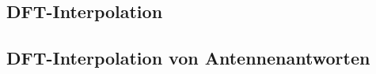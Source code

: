 %
%
\subsection{DFT-Interpolation}\label{dftintp}
%

%
%
\subsection{DFT-Interpolation von Antennenantworten}\label{eadf}
%
